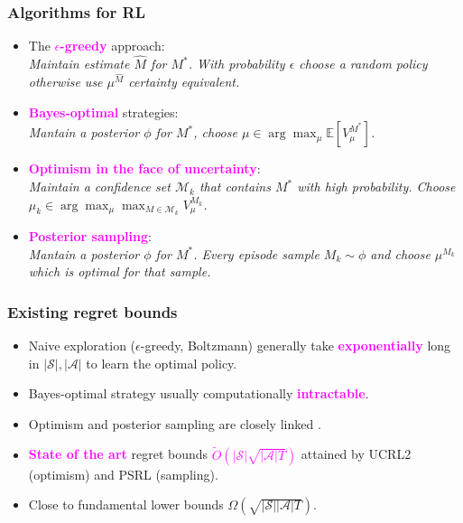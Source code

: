 \documentclass{beamer}
\newlength{\wideitemsep}
\let\olditem\item
\renewcommand{\item}{\setlength{\itemsep}{\wideitemsep}\olditem}
\newcommand{\Exp}{\mathds{E}}
\newcommand{\Sc}{\mathcal{S}}
\newcommand{\Ac}{\mathcal{A}}
\newcommand{\Mc}{\mathcal{M}}
\newcommand{\bspace}{\vspace{3mm}}
\newcommand{\hilite}[1]{\textcolor{magenta}{\textbf{#1}}}
\begin{document}
\begin{frame}
\frametitle{Algorithms for RL}

\begin{itemize}
	\item The \hilite{$\epsilon$-greedy} approach: \\
        \emph{Maintain estimate $\hat{M}$ for $M^*$. With probability $\epsilon$ choose a random policy otherwise use $\mu^{\hat{M}}$ certainty equivalent.}
    \bspace
    \item \hilite{Bayes-optimal} strategies: \\
        \emph{Mantain a posterior $\phi$ for $M^*$, choose $ \mu \in \arg \max_\mu \Exp [V^{M^*}_\mu]$.}
    \bspace
	\item \hilite{Optimism in the face of uncertainty}: \\
        \emph{Maintain a confidence set $\Mc_k$ that contains $M^*$ with high probability. Choose $\mu_k \in \arg\max_\mu \max_{M \in \Mc_k} V^{M_k}_{\mu}$.}
    \bspace
	\item \hilite{Posterior sampling}: \\
        \emph{Mantain a posterior $\phi$ for $M^*$. Every episode sample $M_k \sim \phi$ and choose $\mu^{M_k}$ which is optimal for that sample.}
\end{itemize}
\end{frame}

\begin{frame}
\frametitle{Existing regret bounds}
\begin{itemize}
    \item Naive exploration ($\epsilon$-greedy, Boltzmann) generally take \hilite{exponentially} long in $|\Sc|, |\Ac|$ to learn the optimal policy.
    \bspace
    \item Bayes-optimal strategy usually computationally \hilite{intractable}.
    \bspace
    \item Optimism and posterior sampling are closely linked \cite{russo2013}.
    \bspace
    \item \hilite{State of the art} regret bounds \hilite{$\tilde{O}(|\Sc| \sqrt{|\Ac|T})$} attained by UCRL2 \cite{jaksch2010near} (optimism) and PSRL \cite{osband2013more} (sampling).
    \bspace
    \item Close to fundamental lower bounds $\Omega(\sqrt{|\Sc||\Ac|T})$.
\end{itemize}
\end{frame}
\end{document}
